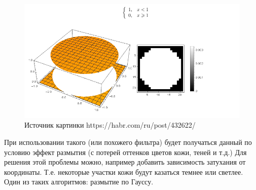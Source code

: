 \documentclass[a4paper, 12pt]{article}
\begin{document}
\begin{enumerate}
        \begin{figure}[!h]
            \centering
            \includegraphics[scale=0.5]{pic1.png}
            \caption*{Источник картинки https://habr.com/ru/post/432622/}
        \end{figure}
 
        При использовании такого (или похожего фильтра) будет получаться данный по условию эффект размытия (с потерей оттенков цветов кожи, теней и т.д.)
        Для решения этой проблемы можно, например добавить зависимость затухания от координаты. Т.е. некоторые участки кожи будут казаться темнее или светлее. Один из таких алгоритмов: размытие по Гауссу.
        
    \end{enumerate}
\end{document}
